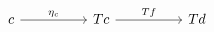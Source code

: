 \[\begin{tikzcd}
	c && Tc && Td
	\arrow["{\eta_{c}}", from=1-1, to=1-3]
	\arrow["Tf", from=1-3, to=1-5]
\end{tikzcd}\]